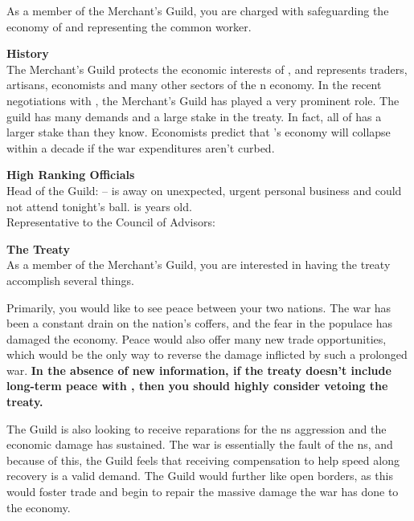 \documentclass[blue]{NeptuneBall}
\begin{document}
\name{\bMerchant{}}

As a member of the Merchant's Guild, you are charged with safeguarding the economy of \pAtlantis{} and representing the common worker.

{\bf History}\\
The Merchant's Guild protects the economic interests of \pAtlantis{}, and represents traders, artisans, economists and many other sectors of the \pAtlantis{}n economy. In the recent negotiations with \pPacifica{}, the Merchant's Guild has played a very prominent role. The guild has many demands and a large stake in the treaty. In fact, all of \pAtlantis{} has a larger stake than they know. Economists predict that \pAtlantis{}'s economy will collapse within a decade if the war expenditures aren't curbed.

{\bf High Ranking Officials}\\
Head of the Guild: \cNautilus{} -- \cNautilus{} is away on unexpected, urgent personal business and could not attend tonight's ball. \cNautilus{} is \cNautilus{\MYnumber} years old.\\
Representative to the Council of Advisors: \cSlave{}

{\bf The Treaty}\\
As a member of the Merchant's Guild, you are interested in having the treaty accomplish several things. 

Primarily, you would like to see peace between your two nations. The war has been a constant drain on the nation's coffers, and the fear in the populace has damaged the economy. Peace would also offer many new trade opportunities, which would be the only way to reverse the damage inflicted by such a prolonged war. {\bf In the absence of new information, if the treaty doesn't include long-term peace with \pPacifica{}, then you should highly consider vetoing the treaty.}

The Guild is also looking to receive reparations for the \pPacifica{}ns aggression and the economic damage \pAtlantis{} has sustained. The war is essentially the fault of the \pPacifica{}ns, and because of this, the Guild feels that receiving compensation to help speed along recovery is a valid demand. The Guild would further like open borders, as this would foster trade and begin to repair the massive damage the war has done to the economy.
\end{document}

